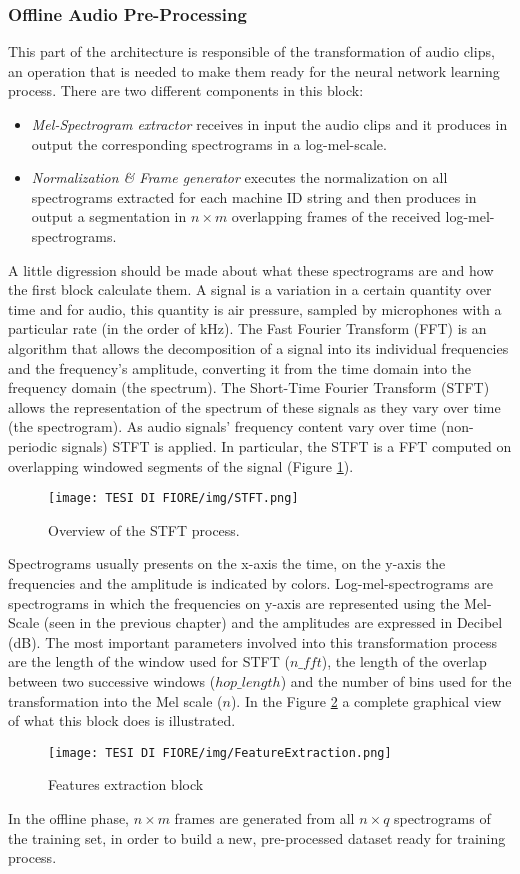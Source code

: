 \subsubsection{Offline Audio Pre-Processing}
This part of the architecture is responsible of the transformation of audio clips, an operation that is needed to make them ready for the neural network learning process. There are two different components in this block:
\begin{itemize}
    \item {\textit{Mel-Spectrogram extractor} receives in input the audio clips and it produces in output the corresponding spectrograms in a log-mel-scale.}
    \item {\textit{Normalization \& Frame generator} executes the normalization on all spectrograms extracted for each machine ID string and then produces in output a segmentation in $n \times m$ overlapping frames of the received log-mel-spectrograms.  }
\end{itemize}
A little digression should be made about what these spectrograms are and how the first block calculate them. A signal is a variation in a certain quantity over time and for audio, this quantity is air pressure, sampled by microphones with a particular rate (in the order of kHz). The Fast Fourier Transform (FFT) is an algorithm that allows the decomposition of a signal into its individual frequencies and the frequency’s amplitude, converting it from the time domain into the frequency domain (the spectrum). The Short-Time Fourier Transform (STFT) allows the representation of the spectrum of these signals as they vary over time (the spectrogram). As audio signals' frequency content vary over time (non-periodic signals) STFT is applied. In particular, the STFT is a FFT computed on overlapping windowed segments of the signal (Figure \ref{sftf}).\\
\begin{figure}[ht]
\texttt{[image: TESI DI FIORE/img/STFT.png]}
\centering
\caption{Overview of the STFT process.}
\label{sftf}
\end{figure}
Spectrograms usually presents on the x-axis the time, on the y-axis the frequencies and the amplitude is indicated by colors. Log-mel-spectrograms are spectrograms in which the frequencies on y-axis are represented using the Mel-Scale (seen in the previous chapter) and the amplitudes are expressed in Decibel (dB). The most important parameters involved into this transformation process are the length of the window used for STFT ($n\_fft$), the length of the overlap between two successive windows ($hop\_length$) and the number of bins used for the transformation into the Mel scale ($n$).
In the Figure \ref{features-extraction} a complete graphical view of what this block does is illustrated.
\begin{figure}[ht]
\texttt{[image: TESI DI FIORE/img/FeatureExtraction.png]}
\centering
\caption{Features extraction block}
\label{features-extraction}
\end{figure}
In the offline phase, $n \times m$ frames are generated from all $n \times q$ spectrograms of the training set, in order to build a new, pre-processed dataset ready for training process.
